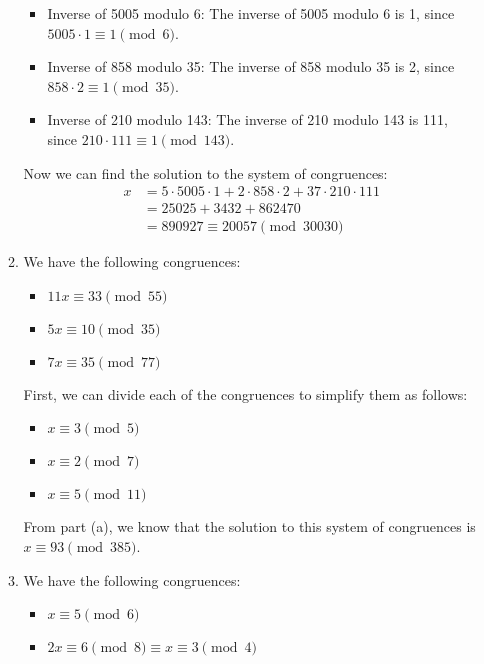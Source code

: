 \documentclass[a4paper]{article}
\begin{document}
\begin{enumerate}
\begin{enumerate}
            \begin{itemize}
                \item Inverse of 5005 modulo 6: The inverse of 5005 modulo 6 is 1, since \(5005 \cdot 1 \equiv 1 \pmod{6}\).
                \item Inverse of 858 modulo 35: The inverse of 858 modulo 35 is 2, since \(858 \cdot 2 \equiv 1 \pmod{35}\).
                \item Inverse of 210 modulo 143: The inverse of 210 modulo 143 is 111, since \(210 \cdot 111 \equiv 1 \pmod{143}\).
            \end{itemize}

            Now we can find the solution to the system of congruences:
            \[
                \begin{split}
                    x &= 5 \cdot 5005 \cdot 1 + 2 \cdot 858 \cdot 2 + 37 \cdot 210 \cdot 111 \\
                    &= 25025 + 3432 + 862470 \\
                    &= 890927 \equiv 20057 \pmod{30030}
                \end{split}
            \]

            \item We have the following congruences:
            \begin{itemize}
                \item \(11x \equiv 33 \pmod{55}\)
                \item \(5x \equiv 10 \pmod{35}\)
                \item \(7x \equiv 35 \pmod{77}\)
            \end{itemize}

            First, we can divide each of the congruences to simplify them as follows:
            \begin{itemize}
                \item \(x \equiv 3 \pmod{5}\)
                \item \(x \equiv 2 \pmod{7}\)
                \item \(x \equiv 5 \pmod{11}\)
            \end{itemize}

            From part (a), we know that the solution to this system of congruences is \(x \equiv 93 \pmod{385}\).


            \item We have the following congruences:
            \begin{itemize}
                \item \(x \equiv 5 \pmod{6}\)
                \item \(2x \equiv 6 \pmod{8} \equiv x \equiv 3 \pmod{4}\)
            \end{itemize}


\end{enumerate}
\end{enumerate}
\end{document}
